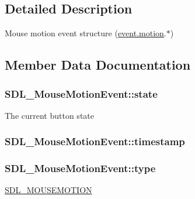 \subsection{Detailed Description}
Mouse motion event structure (\hyperlink{union_s_d_l___event_ac3c89e190faacbe84280cd539453bab6}{event.\+motion}.$\ast$) 

\subsection{Member Data Documentation}
\subsubsection[{\texorpdfstring{state}{state}}]{ S\+D\+L\+\_\+\+Mouse\+Motion\+Event\+::state}\hypertarget{struct_s_d_l___mouse_motion_event_a3f6e9bad9d959b824881ba09e05b7024}{}\label{struct_s_d_l___mouse_motion_event_a3f6e9bad9d959b824881ba09e05b7024}
The current button state 
\subsubsection[{\texorpdfstring{timestamp}{timestamp}}]{ S\+D\+L\+\_\+\+Mouse\+Motion\+Event\+::timestamp}\hypertarget{struct_s_d_l___mouse_motion_event_af530bc0ef327ea6d497c5b1da119841c}{}\label{struct_s_d_l___mouse_motion_event_af530bc0ef327ea6d497c5b1da119841c}
\subsubsection[{\texorpdfstring{type}{type}}]{ S\+D\+L\+\_\+\+Mouse\+Motion\+Event\+::type}\hypertarget{struct_s_d_l___mouse_motion_event_a431dd28cd6db6a7335cf633dbeb80cfb}{}\label{struct_s_d_l___mouse_motion_event_a431dd28cd6db6a7335cf633dbeb80cfb}
\hyperlink{_s_d_l__events_8h_a3b589e89be6b35c02e0dd34a55f3fccaa04c436ef80fef38fb77a89e0e9124c30}{S\+D\+L\+\_\+\+M\+O\+U\+S\+E\+M\+O\+T\+I\+ON} 
